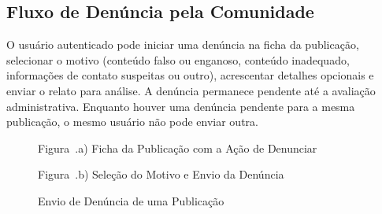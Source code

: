 \clearpage

\subsection*{Fluxo de Denúncia pela Comunidade}
\noindent
O usuário autenticado pode iniciar uma denúncia na ficha da publicação, selecionar o motivo (conteúdo falso ou enganoso, conteúdo inadequado, informações de contato suspeitas ou outro), acrescentar detalhes opcionais e enviar o relato para análise. A denúncia permanece pendente até a avaliação administrativa. Enquanto houver uma denúncia pendente para a mesma publicação, o mesmo usuário não pode enviar outra.

\begin{figure}[H]
    \centering
    \caption{Envio de Denúncia de uma Publicação}
    \label{fig:denuncia_usuario}
    \par\vspace{0.12cm}
    {\small Figura~\thefigure.a) Ficha da Publicação com a Ação de Denunciar}
    \par\vspace{0.2cm}
    \par\vspace{0.12cm}
    {\small Figura~\thefigure.b) Seleção do Motivo e Envio da Denúncia}
    \par\vspace{0.12cm}
\end{figure}

\clearpage

